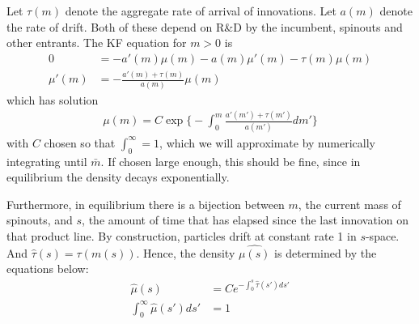 \documentclass[12pt,english]{article}
\theoremstyle{remark}
\begin{document}
Let $\tau(m)$ denote the aggregate rate of arrival of innovations. Let $a(m)$ denote the rate of drift. Both of these depend on R\&D by the incumbent, spinouts and other entrants. The KF equation for $m > 0$ is 
\begin{align*}
	0 &= -a'(m)\mu(m) - a(m)\mu'(m) - \tau(m)\mu(m) \\
	\mu'(m) &= -\frac{a'(m) + \tau(m)}{a(m)} \mu(m)
\end{align*}
which has solution 
\begin{align*}
	\mu(m) = C\exp \Bigg\{ - \int_0^m \frac{a'(m') + \tau(m')}{a(m')} dm'    \Bigg\}
\end{align*}
with $C$ chosen so that $\int_0^{\infty} = 1$, which we will approximate by numerically integrating until $\bar{m}$. If chosen large enough, this should be fine, since in equilibrium the density decays exponentially. 

Furthermore, in equilibrium there is a bijection between $m$, the current mass of spinouts, and $s$, the amount of time that has elapsed since the last innovation on that product line. By construction, particles drift at constant rate 1 in $s$-space. And $\hat{\tau}(s) = \tau(m(s))$. Hence, the density $\hat{\mu(s)}$ is determined by the equations below:
\begin{align*}
	\hat{\mu}(s) &= Ce^{-\int_0^s \hat{\tau}(s')ds'} \\
	\int_0^{\infty} \hat{\mu}(s') ds' &= 1
\end{align*}
\end{document}
